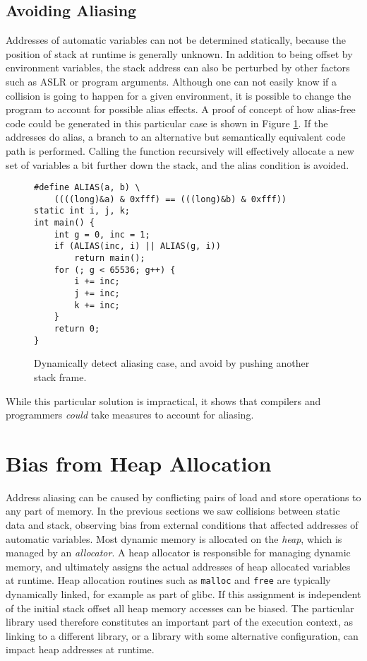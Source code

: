 \documentclass[prodmode,acmtaco]{acmsmall}
\begin{document}
\subsection{Avoiding Aliasing}
Addresses of automatic variables can not be determined statically, because the position of stack at runtime is generally unknown. 
In addition to being offset by environment variables, the stack address can also be perturbed by other factors such as ASLR or program arguments. 
Although one can not easily know if a collision is going to happen for a given environment, it is possible to change the program to account for possible alias effects.
A proof of concept of how alias-free code could be generated in this particular case is shown in Figure \ref{lst:loopfixed}.
If the addresses do alias, a branch to an alternative but semantically equivalent code path is performed.
Calling the function recursively will effectively allocate a new set of variables a bit further down the stack, and the alias condition is avoided.

\begin{figure}
  \begin{lstlisting}[frame=single, xleftmargin=.1\textwidth, xrightmargin=.1\textwidth]
#define ALIAS(a, b) \
    ((((long)&a) & 0xfff) == (((long)&b) & 0xfff))
static int i, j, k;
int main() {
    int g = 0, inc = 1;
    if (ALIAS(inc, i) || ALIAS(g, i))
        return main();
    for (; g < 65536; g++) {
        i += inc;
        j += inc;
        k += inc;
    }
    return 0;
}
  \end{lstlisting}
  \caption{Dynamically detect aliasing case, and avoid by pushing another stack frame.}
  \label{lst:loopfixed}
\end{figure}

While this particular solution is impractical, it shows that compilers and programmers \emph{could} take measures to account for aliasing.


\section{Bias from Heap Allocation}
\label{sec:heap}
Address aliasing can be caused by conflicting pairs of load and store operations to any part of memory.
In the previous sections we saw collisions between static data and stack, observing bias from external conditions that affected addresses of automatic variables.
Most dynamic memory is allocated on the \emph{heap}, which is managed by an \emph{allocator}.
A heap allocator is responsible for managing dynamic memory, and ultimately assigns the actual addresses of heap allocated variables at runtime.
Heap allocation routines such as \texttt{malloc} and \texttt{free} are typically dynamically linked, for example as part of glibc.
If this assignment is independent of the initial stack offset all heap memory accesses can be biased.
The particular library used therefore constitutes an important part of the execution context, as linking to a different library, or a library with some alternative configuration, can impact heap addresses at runtime.
\end{document}

